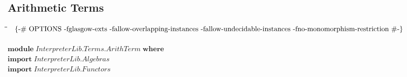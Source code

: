 \documentclass[10pt]{article}
\newlength{\lwidth}\setlength{\lwidth}{4.5cm}
\newlength{\cwidth}\setlength{\cwidth}{8mm} %
\newcommand{\Conid}[1]{\mathit{#1}}
\begin{document}
\subsection{Arithmetic Terms}
\begin{tabbing}
\qquad\=\hspace{\lwidth}\=\hspace{\cwidth}\=\+\kill
${\mbox{\enskip\{-\# OPTIONS -fglasgow-exts -fallow-overlapping-instances -fallow-undecidable-instances -fno-monomorphism-restriction  \#-\}\enskip}}$\\
${}$\\
${\mathbf{module}\;\Conid{\Conid{InterpreterLib}.\Conid{Terms}.ArithTerm}\;\mathbf{where}}$\\
${\mathbf{import}\;\Conid{\Conid{InterpreterLib}.Algebras}}$\\
${\mathbf{import}\;\Conid{\Conid{InterpreterLib}.Functors}}$
\end{tabbing}
\end{document}
